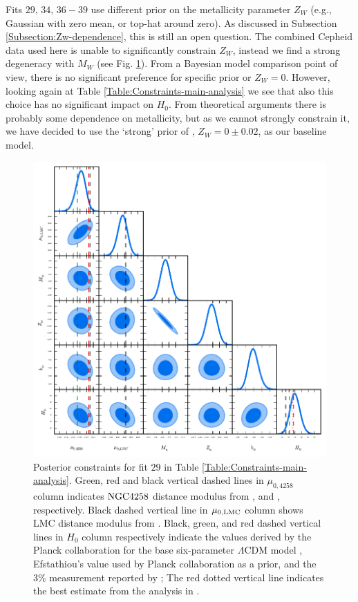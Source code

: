 Fits $29,\,34,\,36-39$ use different prior on the metallicity parameter $Z_W$ (e.g., Gaussian with zero mean, or top-hat around zero). 
As discussed in Subsection \ref{Subsection:Zw-dependence}, this is still an open question. The combined Cepheid data used here is unable to significantly constrain $Z_W$, instead we find a strong degeneracy with $M_W$ (see Fig. \ref{Fig:Main-analysis-fitM1a}). From a Bayesian model comparison point of view, there is no significant preference for specific prior or $Z_W=0$. However, looking again at Table \ref{Table:Constraints-main-analysis} we see that also this choice has no significant impact on $H_0$. From theoretical
arguments there is probably some dependence on metallicity, but as we cannot strongly constrain it, we have decided to use the `strong' prior of \cite{Efstathiou:2013via}, $Z_W = 0 \pm 0.02$, as our baseline model.

\begin{figure}[hbtp]
\centering
\includegraphics[scale=1]{figures/chapter-h0/triangle_plot.pdf}
\caption{Posterior constraints for fit $29$ in Table \ref{Table:Constraints-main-analysis}. Green, red and black vertical dashed lines in $\mu_{0,4258}$ column indicates $\mathrm{NGC4258}$ distance modulus from \cite{Polshaw:2015ika}, \cite{Riess:2016jrr} and \cite{Humphreys:2013eja}, respectively. Black dashed vertical line in $\mu_{0,\mathrm{LMC}}$ column shows LMC distance modulus from \cite{Pietrzynski:2013gia}. Black, green, and red dashed vertical lines in $H_0$ column respectively indicate the values derived by the Planck collaboration for the base six-parameter $\Lambda$CDM model \cite{Ade:2015xua}, Efstathiou's value \cite{Efstathiou:2013via} used by Planck collaboration as a prior, and the $3\%$ measurement reported by \cite{Riess:2011yx}; The red dotted vertical line indicates the best estimate from the analysis in \cite{Riess:2016jrr}.   }
\label{Fig:Main-analysis-fitM1a}
\end{figure}


